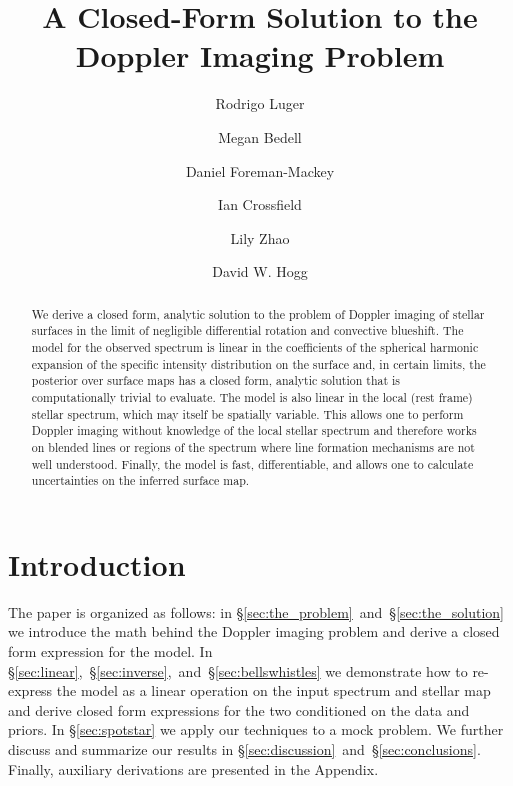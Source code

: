 \documentclass[modern]{aastex631}
\begin{document}
\title{A Closed-Form Solution to the Doppler Imaging Problem}

\author[0000-0002-0296-3826]{Rodrigo Luger}
%
\author[0000-0001-9907-7742]{Megan Bedell}
%
\author[0000-0002-9328-5652]{Daniel Foreman-Mackey}
%
\author[0000-0002-1835-1891]{Ian Crossfield}
%
\author[0000-0002-3852-3590]{Lily Zhao}
%
\author[0000-0003-2866-9403]{David W. Hogg}

\begin{abstract}
    We derive a closed form, analytic solution to the problem of Doppler imaging of stellar surfaces in the limit of negligible differential rotation and convective blueshift.
    The model for the observed spectrum is linear in the coefficients of the spherical harmonic expansion of the specific intensity distribution on the surface and, in certain limits, the posterior over surface maps has a closed form, analytic solution that is computationally trivial to evaluate.
    The model is also linear in the local (rest frame) stellar spectrum, which may itself be spatially variable.
    This allows one to perform Doppler imaging without knowledge of the local stellar spectrum and therefore works on blended lines or regions of the spectrum where line formation mechanisms are not well understood.
    Finally, the model is fast, differentiable, and allows one to calculate uncertainties on the inferred surface map.
\end{abstract}

\section{Introduction}
The paper is organized as follows: in \S\ref{sec:the_problem}~and~\S\ref{sec:the_solution} we introduce the math behind the Doppler imaging problem and derive a closed form expression for the model. 
In \S\ref{sec:linear},~\S\ref{sec:inverse},~and~\S\ref{sec:bellswhistles} we demonstrate how to re-express the model as a linear operation on the input spectrum and stellar map and derive closed form expressions for the two conditioned on the data and priors.
In \S\ref{sec:spotstar} we apply our techniques to a mock problem. 
We further discuss and summarize our results in \S\ref{sec:discussion}~and~\S\ref{sec:conclusions}. 
Finally, auxiliary derivations are presented in the Appendix.
\end{document}
